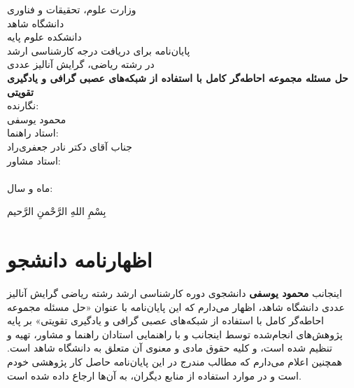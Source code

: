 \documentclass[12pt,a4paper,oneside]{report}
\theoremstyle{definition}
\theoremstyle{plain}
\begin{document}
\begin{titlepage}
\centering
{\large وزارت علوم، تحقیقات و فناوری}\\[0.4cm]
{\large دانشگاه شاهد}\\[0.15cm]
{\large دانشکده علوم پایه}\\[1.2cm]

{\large پایان‌نامه برای دریافت درجه کارشناسی ارشد}\\[0.2cm]
{\large در رشته ریاضی، گرایش آنالیز عددی}\\[1.6cm]

{\Large\bfseries حل مسئله مجموعه احاطه‌گر کامل با استفاده از شبکه‌های عصبی
گرافی و یادگیری تقویتی}\\[1.8cm]

{\large نگارنده:}\\[0.15cm]
{\large محمود یوسفی}\\[1.2cm]

{\large استاد راهنما:}\\[0.15cm]
{\large جناب آقای دکتر نادر جعفری‌راد}\\[0.9cm]

{\large استاد مشاور:}\\[0.15cm]
{\large \lr{\dots\dots\dots\dots\dots\dots\dots\dots}}\\[1.2cm]

{\large ماه و سال:}\\[0.15cm]
{\large \lr{\dots\dots\dots\dots\dots\dots\dots\dots}}
\end{titlepage}


\thispagestyle{empty}
\vspace*{\fill}
\begin{center}
  {\Large بِسْمِ اللهِ الرَّحْمنِ الرَّحیم}
\end{center}
\vspace*{\fill}
\clearpage

\chapter*{اظهارنامه دانشجو}
اینجانب \textbf{محمود یوسفی} دانشجوی دوره کارشناسی ارشد رشته ریاضی گرایش آنالیز
عددی دانشگاه شاهد، اظهار می‌دارم که این پایان‌نامه با عنوان
«حل مسئله مجموعه احاطه‌گر کامل با استفاده از شبکه‌های عصبی گرافی و یادگیری
تقویتی» بر پایه پژوهش‌های انجام‌شده توسط اینجانب و با راهنمایی استادان
راهنما و مشاور، تهیه و تنظیم شده است، و کلیه حقوق مادی و معنوی آن متعلق به
دانشگاه شاهد است. همچنین اعلام می‌دارم که مطالب مندرج در این پایان‌نامه
حاصل کار پژوهشی خودم است و در موارد استفاده از منابع دیگران، به آن‌ها
ارجاع داده شده است.
\vspace{1.5cm}
\end{document}
